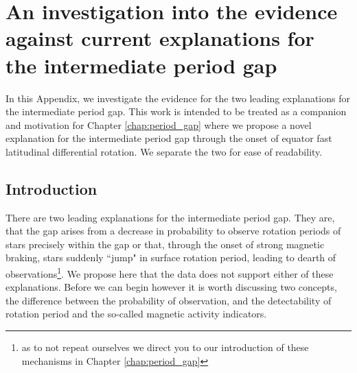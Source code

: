 \newcommand\apogee{\project{APOGEE}}


\chapter{An investigation into the evidence against current explanations for the intermediate period gap}
\label{apndx:magnetic}

In this Appendix, we investigate the evidence for the two leading explanations for the intermediate period gap.
This work is intended to be treated as a companion and motivation for Chapter \ref{chap:period_gap} where we propose a novel explanation for the intermediate period gap through the onset of equator fast latitudinal differential rotation.
We separate the two for ease of readability.

\section{Introduction}

There are two leading explanations for the intermediate period gap.
They are, that the gap arises from a decrease in probability to observe rotation periods of stars precisely within the gap or that, through the onset of strong magnetic braking, stars suddenly ``jump" in surface rotation period, leading to dearth of observations\footnote{as to not repeat ourselves we direct you to our introduction of these mechanisms in Chapter \ref{chap:period_gap}}.
We propose here that the data does not support either of these explanations.
Before we can begin however it is worth discussing two concepts, the difference between the probability of observation, and the detectability of rotation period and the so-called magnetic activity indicators.

